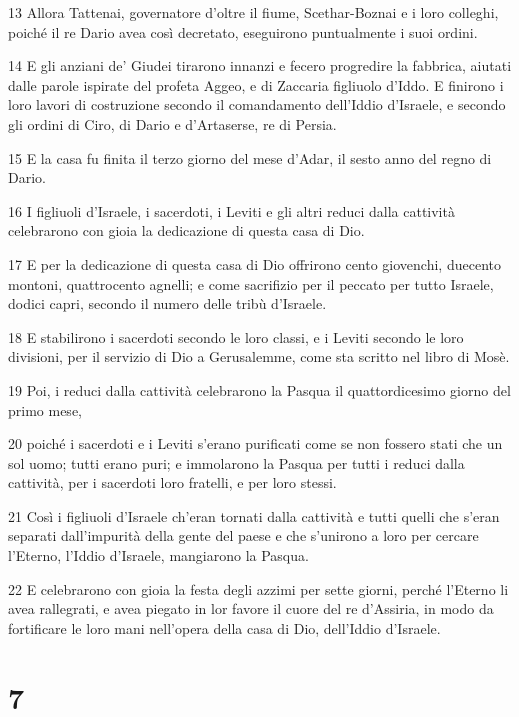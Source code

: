 \par 13 Allora Tattenai, governatore d'oltre il fiume, Scethar-Boznai e i loro colleghi, poiché il re Dario avea così decretato, eseguirono puntualmente i suoi ordini.
\par 14 E gli anziani de' Giudei tirarono innanzi e fecero progredire la fabbrica, aiutati dalle parole ispirate del profeta Aggeo, e di Zaccaria figliuolo d'Iddo. E finirono i loro lavori di costruzione secondo il comandamento dell'Iddio d'Israele, e secondo gli ordini di Ciro, di Dario e d'Artaserse, re di Persia.
\par 15 E la casa fu finita il terzo giorno del mese d'Adar, il sesto anno del regno di Dario.
\par 16 I figliuoli d'Israele, i sacerdoti, i Leviti e gli altri reduci dalla cattività celebrarono con gioia la dedicazione di questa casa di Dio.
\par 17 E per la dedicazione di questa casa di Dio offrirono cento giovenchi, duecento montoni, quattrocento agnelli; e come sacrifizio per il peccato per tutto Israele, dodici capri, secondo il numero delle tribù d'Israele.
\par 18 E stabilirono i sacerdoti secondo le loro classi, e i Leviti secondo le loro divisioni, per il servizio di Dio a Gerusalemme, come sta scritto nel libro di Mosè.
\par 19 Poi, i reduci dalla cattività celebrarono la Pasqua il quattordicesimo giorno del primo mese,
\par 20 poiché i sacerdoti e i Leviti s'erano purificati come se non fossero stati che un sol uomo; tutti erano puri; e immolarono la Pasqua per tutti i reduci dalla cattività, per i sacerdoti loro fratelli, e per loro stessi.
\par 21 Così i figliuoli d'Israele ch'eran tornati dalla cattività e tutti quelli che s'eran separati dall'impurità della gente del paese e che s'unirono a loro per cercare l'Eterno, l'Iddio d'Israele, mangiarono la Pasqua.
\par 22 E celebrarono con gioia la festa degli azzimi per sette giorni, perché l'Eterno li avea rallegrati, e avea piegato in lor favore il cuore del re d'Assiria, in modo da fortificare le loro mani nell'opera della casa di Dio, dell'Iddio d'Israele.

\chapter{7}


